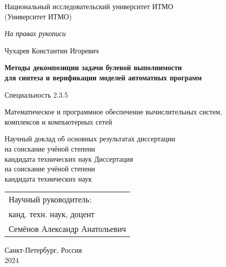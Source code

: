 \thispagestyle{empty}

\begin{center}
    Национальный исследовательский университет ИТМО \\
    (Университет ИТМО)
\end{center}


\vspace{0pt plus1fill}
\hfill\textit{На правах рукописи}
\vspace{0pt plus1fill}

\begin{center}

{\large
    Чухарев Константин Игоревич
}

\vspace{1cm}

\textbf{\large
Методы декомпозиции задачи булевой выполнимости \\
для синтеза и верификации моделей автоматных программ
}

\vspace{1cm}

Специальность 2.3.5
\begin{SingleSpace*}
    \small
    Математическое и программное обеспечение вычислительных систем, \\
    комплексов и компьютерных сетей
\end{SingleSpace*}

\vspace{1cm}

\ifsynopsis
Научный доклад об основных результатах диссертации \\
на соискание учёной степени \\
кандидата технических наук
\else
Диссертация \\
на соискание учёной степени \\
кандидата технических наук
\fi

\end{center}

\vspace{0pt plus1fill}

\hfill\begin{tabular}{l}
Научный руководитель: \\
канд. техн. наук, доцент \\
Семёнов Александр Анатольевич
\end{tabular}

\vspace{0pt plus1fill}

\begin{center}
    Санкт-Петербург, Россия \\
    2024
\end{center}
